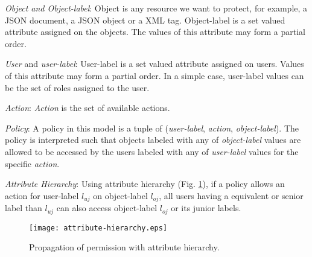 
\emph{Object and Object-label}: Object is any resource we want to protect, for example, a JSON document, a JSON object or a XML tag. Object-label is a set valued attribute assigned on the objects. The values of this attribute may form a partial order.


\emph{User} and \emph{user-label}: User-label is a set valued attribute assigned on users. Values of this attribute  may form a partial order. In a simple case, user-label values can be the set of roles assigned to the user. 

\emph{Action}: \textit{Action} is the set of available actions.


\emph{Policy}: A policy in this model is a tuple of (\emph{user-label}, \emph{action},  \emph{object-label}). The policy is interpreted such that objects labeled with any of \textit{object-label} values are allowed to be accessed by the users labeled with any of  \textit{user-label} values for the specific \textit{action}.


\emph{Attribute Hierarchy}: Using attribute hierarchy (Fig. \ref{fig:attribute-hierarchy}), if a policy allows an action for user-label $l_{uj}$ on object-label $l_{oj}$, all users having a equivalent or senior label than $l_{uj}$ can also access object-label $l_{oj}$ or its junior labels.

\begin{figure}
  \centering
    \texttt{[image: attribute-hierarchy.eps]}
 \caption{Propagation of permission with attribute hierarchy.}
 \label{fig:attribute-hierarchy}
\end{figure}


